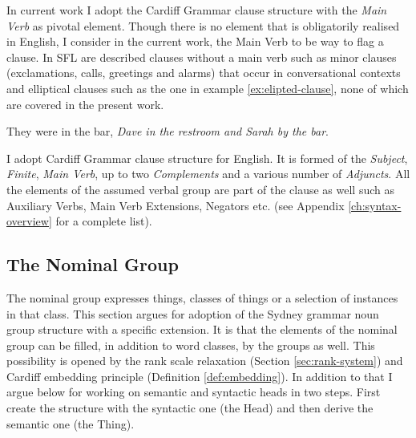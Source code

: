 In current work I adopt the Cardiff Grammar clause structure with the \textit{Main Verb} as pivotal element. Though there is no element that is obligatorily realised in English, I consider in the current work, the Main Verb to be way to flag a clause. In SFL are described clauses without a main verb such as minor clauses (exclamations, calls, greetings and alarms) that occur in conversational contexts and elliptical clauses \citet{Halliday2013} such as the one in example \ref{ex:elipted-clause}, none of which are covered in the present work.

\begin{exe}
	\ex\label{ex:elipted-clause} They were in the bar, \textit{Dave in the restroom and Sarah by the bar}.
\end{exe}

I adopt Cardiff Grammar clause structure for English. It is formed of the \textit{Subject}, \textit{Finite}, \textit{Main Verb}, up to two \textit{Complements} and a various number of \textit{Adjuncts}. All the elements of the assumed verbal group are part of the clause as well such as Auxiliary Verbs, Main Verb Extensions, Negators etc. (see Appendix \ref{ch:syntax-overview} for a 
complete list).




\subsection{The Nominal Group}
\label{sec:nominal-group}

The nominal group expresses things, classes of things or a selection of instances in that class. This section argues for adoption of the Sydney grammar noun group structure with a specific extension. It is that the elements of the nominal group can be filled, in addition to word classes, by the groups as well. This possibility is opened by the rank scale relaxation (Section \ref{sec:rank-system}) and Cardiff embedding principle (Definition \ref{def:embedding}). In addition to that I argue below for working on semantic and syntactic heads in two steps. First create the structure with the syntactic one (the Head) and then derive the semantic one (the Thing).

